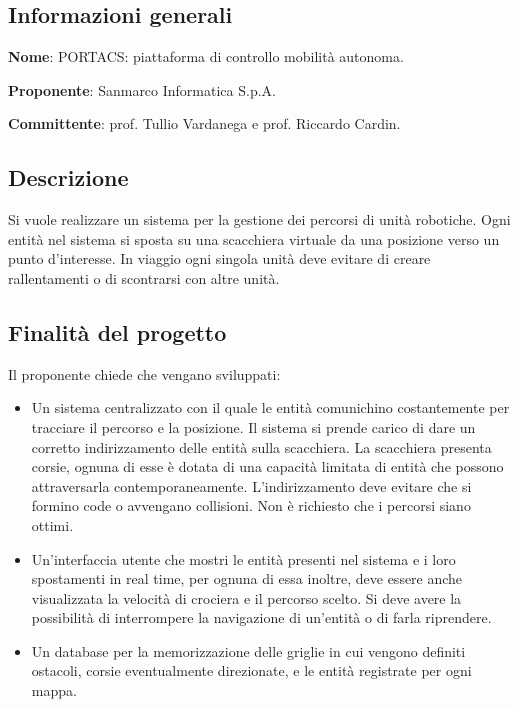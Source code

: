 \documentclass[../studio-di-fattibilita.tex]{subfiles}
\begin{document}
\subsection{Informazioni generali}%
\label{sub:c5_informazioni_generale}
\begin{description}
  \item \textbf{Nome}: PORTACS: piattaforma di controllo mobilità autonoma.
  \item \textbf{Proponente}: Sanmarco Informatica S.p.A.
  \item \textbf{Committente}: prof. Tullio Vardanega e prof. Riccardo Cardin.
\end{description}

\subsection{Descrizione}%
\label{sub:c5_descrizione}
Si vuole realizzare un sistema per la gestione dei percorsi di unità robotiche. Ogni entità nel sistema si sposta su una scacchiera virtuale da una posizione verso un punto d’interesse. In viaggio ogni singola unità deve evitare di creare rallentamenti o di scontrarsi con altre unità.

\subsection{Finalità del progetto}%
\label{sub:c5_finalita_del_progetto}
Il proponente chiede che vengano sviluppati:
\begin{itemize}
  \item Un sistema centralizzato con il quale le entità comunichino costantemente per tracciare il percorso e la posizione. Il sistema si prende carico di dare un corretto indirizzamento delle entità sulla scacchiera. La scacchiera presenta corsie, ognuna di esse è dotata di una capacità limitata di entità che possono attraversarla contemporaneamente. L’indirizzamento deve evitare che si formino code o avvengano collisioni. Non è richiesto che i percorsi siano ottimi.
  \item Un’interfaccia utente che mostri le entità presenti nel sistema e i loro spostamenti in real time, per ognuna  di essa inoltre, deve essere anche visualizzata la velocità di crociera e il percorso scelto. Si deve avere la possibilità di interrompere la navigazione di un’entità o di farla riprendere.
  \item Un database per la memorizzazione delle griglie in cui vengono definiti ostacoli, corsie eventualmente direzionate, e le entità registrate per ogni mappa.
\end{itemize}
\end{document}
